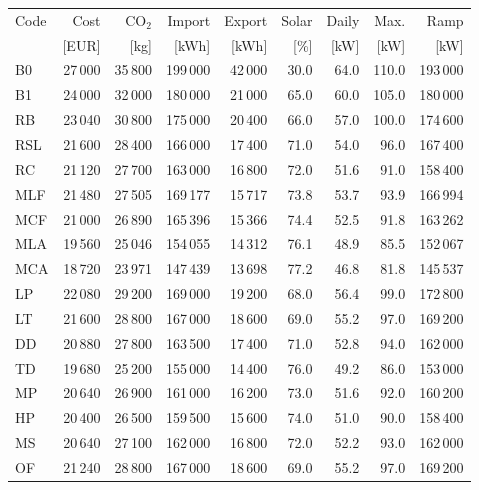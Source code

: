 \noindent\begin{minipage}{\textwidth}\singlespacing\captionsetup{font=footnotesize}
\setlength{\tabcolsep}{4pt}
\renewcommand{\arraystretch}{1.0}
\label{tab:full-scorecard-0-0}
\fontsize{8}{9}\selectfont
\begin{tabular*}{\textwidth}{@{\extracolsep{\fill}}lrrrrrrrr@{}}
\toprule
Code & Cost & CO$_2$ & Import & Export & Solar & Daily & Max. & Ramp\\
 & [EUR] & [kg] & [kWh] & [kWh] & [\%] & [kW] & [kW] & [kW]\\
\midrule
B0 & 27\,000 & 35\,800 & 199\,000 & 42\,000 & 30.0 & 64.0 & 110.0 & 193\,000\\
B1 & 24\,000 & 32\,000 & 180\,000 & 21\,000 & 65.0 & 60.0 & 105.0 & 180\,000\\
RB & 23\,040 & 30\,800 & 175\,000 & 20\,400 & 66.0 & 57.0 & 100.0 & 174\,600\\
RSL & 21\,600 & 28\,400 & 166\,000 & 17\,400 & 71.0 & 54.0 & 96.0 & 167\,400\\
RC & 21\,120 & 27\,700 & 163\,000 & 16\,800 & 72.0 & 51.6 & 91.0 & 158\,400\\
MLF & 21\,480 & 27\,505 & 169\,177 & 15\,717 & 73.8 & 53.7 & 93.9 & 166\,994\\
MCF & 21\,000 & 26\,890 & 165\,396 & 15\,366 & 74.4 & 52.5 & 91.8 & 163\,262\\
MLA & 19\,560 & 25\,046 & 154\,055 & 14\,312 & 76.1 & 48.9 & 85.5 & 152\,067\\
MCA & 18\,720 & 23\,971 & 147\,439 & 13\,698 & 77.2 & 46.8 & 81.8 & 145\,537\\
LP & 22\,080 & 29\,200 & 169\,000 & 19\,200 & 68.0 & 56.4 & 99.0 & 172\,800\\
LT & 21\,600 & 28\,800 & 167\,000 & 18\,600 & 69.0 & 55.2 & 97.0 & 169\,200\\
DD & 20\,880 & 27\,800 & 163\,500 & 17\,400 & 71.0 & 52.8 & 94.0 & 162\,000\\
TD & 19\,680 & 25\,200 & 155\,000 & 14\,400 & 76.0 & 49.2 & 86.0 & 153\,000\\
MP & 20\,640 & 26\,900 & 161\,000 & 16\,200 & 73.0 & 51.6 & 92.0 & 160\,200\\
HP & 20\,400 & 26\,500 & 159\,500 & 15\,600 & 74.0 & 51.0 & 90.0 & 158\,400\\
MS & 20\,640 & 27\,100 & 162\,000 & 16\,800 & 72.0 & 52.2 & 93.0 & 162\,000\\
OF & 21\,240 & 28\,800 & 167\,000 & 18\,600 & 69.0 & 55.2 & 97.0 & 169\,200\\

\end{tabular*}
\end{minipage}
